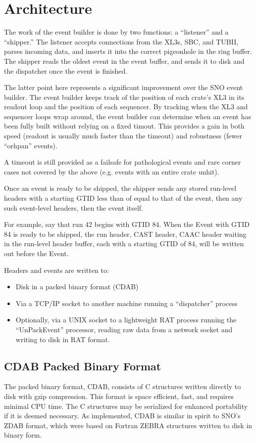 \documentclass[11pt,twocolumn]{article}
\begin{document}
\section{Architecture}
The work of the event builder is done by two functions: a ``listener'' and a ``shipper.'' The listener accepts connections from the XL3s, SBC, and TUBII, parses incoming data, and inserts it into the correct pigeonhole in the ring buffer. The shipper reads the oldest event in the event buffer, and sends it to disk and the dispatcher once the event is finished.

The latter point here represents a significant improvement over the SNO event builder. The event builder keeps track of the position of each crate's XL3 in its readout loop and the position of each sequencer. By tracking when the XL3 and sequencer loops wrap around, the event builder can determine when an event has been fully built without relying on a fixed timout. This provides a gain in both speed (readout is usually much faster than the timeout) and robustness (fewer ``orhpan'' events).

A timeout is still provided as a failsafe for pathological events and rare corner cases not covered by the above (e.g. events with an entire crate unhit).

Once an event is ready to be shipped, the shipper sends any stored run-level headers with a starting GTID less than of equal to that of the event, then any such event-level headers, then the event itself.

For example, say that run 42 begins with GTID 84. When the Event with GTID 84 is ready to be shipped, the run header, CAST header, CAAC header waiting in the run-level header buffer, each with a starting GTID of 84, will be written out before the Event.

Headers and events are written to:
\begin{itemize}
\item Disk in a packed binary format (CDAB)
\item Via a TCP/IP socket to another machine running a ``dispatcher'' process
\item Optionally, via a UNIX socket to a lightweight RAT process running the ``UnPackEvent'' processor, reading raw data from a network socket and writing to disk in RAT format.
\end{itemize}

\subsection{CDAB Packed Binary Format}
The packed binary format, CDAB, consists of C structures written directly to disk with gzip compression. This format is space efficient, fast, and requires minimal CPU time. The C structures may be serialized for enhanced portability if it is deemed necessary. As implemented, CDAB is similar in spirit to SNO's ZDAB format, which were based on Fortran ZEBRA structures written to disk in binary form.
\end{document}
